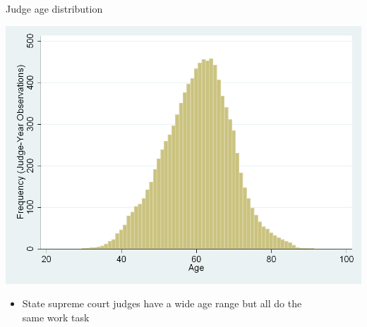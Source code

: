 \documentclass[english]{beamer}
\begin{document}
\begin{frame}{Judge age distribution}
\begin{center}
\includegraphics[scale=0.25]{Images/ash_macleod2.png}
\end{center}
\begin{itemize}
\setlength{\itemsep}{1.2em}
\setlength{\itemindent}{-0.5em}
\item State supreme court judges have a wide age range but all do the\\
\hspace{-5pt}same work task
\end{itemize}
\end{frame}
\end{document}
